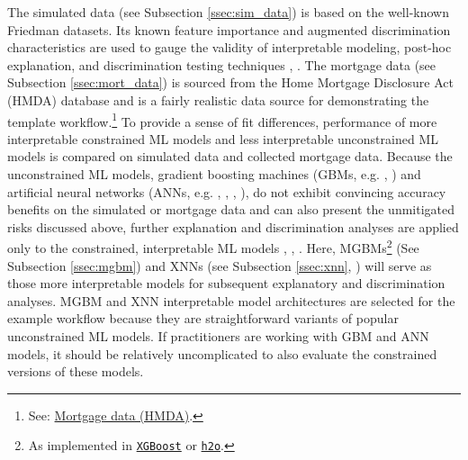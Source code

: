 \documentclass[information,article,submit,moreauthors,pdftex]{definitions/mdpi}
\begin{document}
The simulated data (see Subsection \ref{ssec:sim_data}) is based on the well-known Friedman datasets. Its known feature importance and augmented discrimination characteristics are used to gauge the validity of interpretable modeling, post-hoc explanation, and discrimination testing techniques \cite{friedman1979tree}, \cite{friedman1991multivariate}. The mortgage data (see Subsection \ref{ssec:mort_data}) is sourced from the Home Mortgage Disclosure Act (HMDA) database and is a fairly realistic data source for demonstrating the template workflow.\footnote{See: \href{https://www.consumerfinance.gov/data-research/hmda/}{Mortgage data (HMDA)}.} To provide a sense of fit differences, performance of more interpretable constrained ML models and less interpretable unconstrained ML models is compared on simulated data and collected mortgage data. Because the unconstrained ML models, gradient boosting machines (GBMs, e.g. \cite{friedman2001greedy}, \cite{esl}) and artificial neural networks (ANNs, e.g. \cite{recht2011hogwild}, \cite{hinton2012improving}, \cite{sutskever2013importance}, \cite{zeiler2012adadelta}), do not exhibit convincing accuracy benefits on the simulated or mortgage data and can also present the unmitigated risks discussed above, further explanation and discrimination analyses are applied only to the constrained, interpretable ML models \cite{please_stop}, \cite{fair_washing}, \cite{scaffolding}. Here, MGBMs\footnote{As implemented in \href{https://xgboost.readthedocs.io/en/latest/tutorials/monotonic.html}{\texttt{XGBoost}} or \href{https://github.com/h2oai/h2o-3/blob/master/h2o-py/demos/H2O_tutorial_gbm_monotonicity.ipynb}{\texttt{h2o}}.} (See Subsection \ref{ssec:mgbm}) and XNNs (see Subsection \ref{ssec:xnn}, \cite{wf_xnn} \cite{yang2019enhancing}) will serve as those more interpretable models for subsequent explanatory and discrimination analyses. MGBM and XNN interpretable model architectures are selected for the example workflow because they are straightforward variants of popular unconstrained ML models. If practitioners are working with GBM and ANN models, it should be relatively uncomplicated to also evaluate the constrained versions of these models. 
\end{document}
